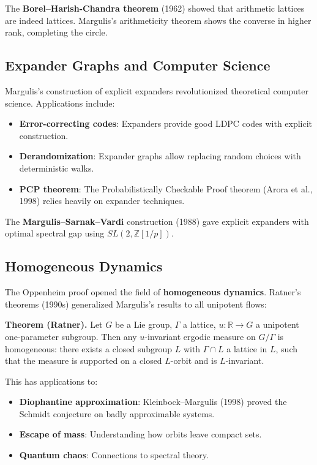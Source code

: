 The \textbf{Borel--Harish-Chandra theorem} (1962) showed that
arithmetic lattices are indeed lattices. Margulis's arithmeticity
theorem shows the converse in higher rank, completing the circle.

\subsection{Expander Graphs and Computer Science}

Margulis's construction of explicit expanders revolutionized theoretical
computer science. Applications include:

\begin{itemize}
\item \textbf{Error-correcting codes}: Expanders provide good
LDPC codes with explicit construction.
\item \textbf{Derandomization}: Expander graphs allow replacing
random choices with deterministic walks.
\item \textbf{PCP theorem}: The Probabilistically Checkable Proof
theorem (Arora et al., 1998) relies heavily on expander
techniques.
\end{itemize}

The \textbf{Margulis--Sarnak--Vardi} construction (1988) gave explicit
expanders with optimal spectral gap using $SL(2,\mathbb{Z}[1/p])$.

\subsection{Homogeneous Dynamics}

The Oppenheim proof opened the field of \textbf{homogeneous dynamics}.
Ratner's theorems (1990s) generalized Margulis's results to all
unipotent flows:

\textbf{Theorem (Ratner).} Let $G$ be a Lie group, $\Gamma$ a lattice,
$u: \mathbb{R} \to G$ a unipotent one-parameter subgroup. Then any
$u$-invariant ergodic measure on $G/\Gamma$ is homogeneous: there
exists a closed subgroup $L$ with $\Gamma \cap L$ a lattice in $L$,
such that the measure is supported on a closed $L$-orbit and is
$L$-invariant.

This has applications to:
\begin{itemize}
\item \textbf{Diophantine approximation}: Kleinbock--Margulis (1998)
proved the Schmidt conjecture on badly approximable systems.
\item \textbf{Escape of mass}: Understanding how orbits leave
compact sets.
\item \textbf{Quantum chaos}: Connections to spectral theory.
\end{itemize}

